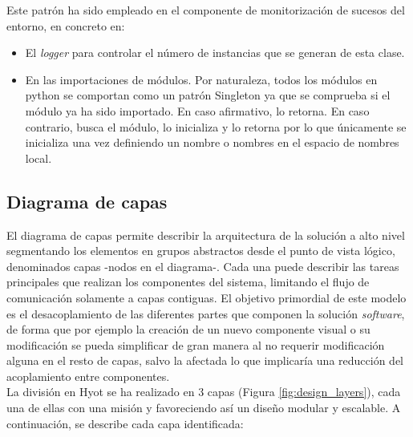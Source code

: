 \documentclass[12pt,a4paper, twoside]{report}
\begin{document}
	Este patrón ha sido empleado en el componente de monitorización de sucesos del entorno, en concreto en:

	\begin{itemize}
		\item El \textit{logger} para controlar el número de instancias que se generan de esta clase.
		\item En las importaciones de módulos. Por naturaleza, todos los módulos en \gls{python} se comportan como un patrón Singleton ya que se comprueba si el módulo ya ha sido importado. En caso afirmativo, lo retorna. En caso contrario, busca el módulo, lo inicializa y lo retorna por lo que únicamente se inicializa una vez definiendo un nombre o nombres en el espacio de nombres local.
	\end{itemize}
		
	\subsection{Diagrama de capas}
	
	El diagrama de capas permite describir la arquitectura de la solución a alto nivel segmentando los elementos en grupos abstractos desde el punto de vista lógico, denominados capas -nodos en el diagrama-. Cada una puede describir las tareas principales que realizan los componentes del sistema, limitando el flujo de comunicación solamente a capas contiguas. El objetivo primordial de este modelo es el desacoplamiento de las diferentes partes que componen la solución \textit{software}, de forma que por ejemplo la creación de un nuevo componente visual o su modificación se pueda simplificar de gran manera al no requerir modificación alguna en el resto de capas, salvo la afectada lo que implicaría una reducción del acoplamiento entre componentes. \\
		
	La división en Hyot se ha realizado en 3 capas (Figura \ref{fig:design_layers}), cada una de ellas con una misión y favoreciendo así un diseño modular y escalable. A continuación, se describe cada capa identificada:
	
\end{document}
